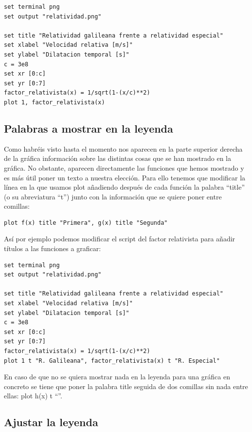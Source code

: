 \documentclass[11pt,a4paper,twoside,pdf]{article}
\numberwithin{equation}{section}
\begin{document}
\begin{lstlisting}[language=Gnuplot]
set terminal png
set output "relatividad.png"

set title "Relatividad galileana frente a relatividad especial"
set xlabel "Velocidad relativa [m/s]"
set ylabel "Dilatacion temporal [s]"
c = 3e8
set xr [0:c]
set yr [0:7]
factor_relativista(x) = 1/sqrt(1-(x/c)**2)
plot 1, factor_relativista(x)
\end{lstlisting}

\subsection{Palabras a mostrar en la leyenda}

Como habréis visto hasta el momento nos aparecen en la parte superior derecha de la gráfica información sobre las distintas cosas que se han mostrado en la gráfica. No obstante, aparecen directamente las funciones que hemos mostrado y es más útil poner un texto a nuestra elección. Para ello tenemos que modificar la línea en la que usamos plot añadiendo después de cada función la palabra ``title'' (o su abreviatura ``t'') junto con la información que se quiere poner entre comillas:

\begin{lstlisting}[language=Gnuplot]
plot f(x) title "Primera", g(x) title "Segunda"
\end{lstlisting}

Así por ejemplo podemos modificar el script del factor relativista para añadir títulos a las funciones a graficar:

\begin{lstlisting}[language=Gnuplot]
set terminal png
set output "relatividad.png"

set title "Relatividad galileana frente a relatividad especial"
set xlabel "Velocidad relativa [m/s]"
set ylabel "Dilatacion temporal [s]"
c = 3e8
set xr [0:c]
set yr [0:7]
factor_relativista(x) = 1/sqrt(1-(x/c)**2)
plot 1 t "R. Galileana", factor_relativista(x) t "R. Especial"
\end{lstlisting}

En caso de que no se quiera mostrar nada en la leyenda para una gráfica en concreto se tiene que poner la palabra title seguida de dos comillas sin nada entre ellas: plot h(x) t ``''.

\subsection{Ajustar la leyenda}
\end{document}
